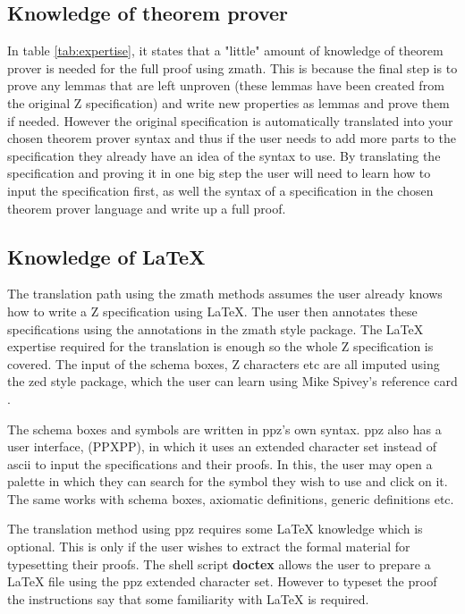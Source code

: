 \subsection{Knowledge of theorem prover}
In table \ref{tab:expertise}, it states that a "little" amount of knowledge of theorem prover is needed for the full proof using \gls{zmath}. This is because the final step is to prove any lemmas that are left unproven (these lemmas have been created from the original Z specification) and write new properties as lemmas and prove them if needed. However the original specification is automatically translated into your chosen theorem prover syntax and thus if the user needs to add more parts to the specification they already have an idea of the syntax to use. By translating the specification and proving it in one big step the user will need to learn how to input the specification first, as well the syntax of a specification in the chosen theorem prover language and write up a full proof. 

\subsection{Knowledge of \LaTeX}
The translation path using the \gls{zmath} methods assumes the user already knows how to write a Z specification using \LaTeX{}. The user then annotates these specifications using the annotations in the \gls{zmath} style package. The \LaTeX{} expertise required for the translation is enough so the whole Z specification is covered. The input of the schema boxes, Z characters etc are all imputed using the zed style package, which the user can learn using Mike Spivey's reference card \cite{zrefcard}.

The schema boxes and symbols are written in \gls{ppz}'s own syntax. \gls{ppz} also has a user interface, (PPXPP), in which it uses an extended character set instead of ascii to input the specifications and their proofs. In this, the user may open a palette in which they can search for the symbol they wish to use and click on it. The same works with schema boxes, axiomatic definitions, generic definitions etc. 

The translation method using \gls{ppz} requires some \LaTeX{} knowledge which is optional. This is only if the user wishes to extract the formal material for typesetting their proofs. The shell script \textbf{doctex} allows the user to prepare a \LaTeX{} file using the \gls{ppz} extended character set. However to typeset the proof the instructions say that some familiarity with \LaTeX{} is required.

